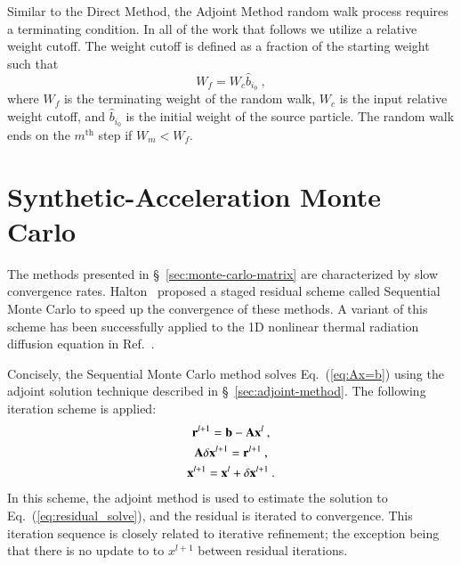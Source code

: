 \documentclass[preprint,12pt]{elsarticle}
\newcommand{\vA}{\ensuremath{\ve{A}}}
\newcommand{\vb}{\ensuremath{\ve{b}}}
\newcommand{\vx}{\ensuremath{\ve{x}}}
\newcommand{\vr}{\ensuremath{\ve{r}}}
\begin{document}
Similar to the Direct Method, the Adjoint Method random walk process
requires a terminating condition.  In all of the work that follows we
utilize a relative weight cutoff.  The weight cutoff is defined as a
fraction of the starting weight such that
\begin{equation}
  W_f = W_c\hat{b}_{i_0}\:,
  \label{eq:weight_cutoff}
\end{equation}
where $W_f$ is the terminating weight of the random walk, $W_c$ is the
input relative weight cutoff, and $\hat{b}_{i_0}$ is the initial
weight of the source particle.  The random walk ends on the
$m^\text{th}$ step if $W_m < W_f$.

\section{Synthetic-Acceleration Monte Carlo}
\label{sec:iter-refin-monte}

The methods presented in \S~\ref{sec:monte-carlo-matrix} are
characterized by slow convergence rates.
Halton~\cite{halton_1962,halton_1994} proposed a staged residual
scheme called Sequential Monte Carlo to speed up the convergence of
these methods.  A variant of this scheme has been successfully applied
to the 1D nonlinear thermal radiation diffusion equation in
Ref.~\cite{evans_2003}.

Concisely, the Sequential Monte Carlo method solves
Eq.~(\ref{eq:Ax=b}) using the adjoint solution technique described in
\S~\ref{sec:adjoint-method}.  The following iteration scheme is
applied:
\begin{subequations}
  \begin{gather}
    \vr^{l+1} = \vb - \vA\vx^{l}\:, \\
    \vA\delta\vx^{l+1} = \vr^{l+1}\:, \label{eq:residual_solve}\\
    \vx^{l+1} = \vx^{l} + \delta\vx^{l+1}\:.
  \end{gather}
\end{subequations}
In this scheme, the adjoint method is used to estimate the solution to
Eq.~(\ref{eq:residual_solve}), and the residual is iterated to
convergence.  This iteration sequence is closely related to iterative
refinement; the exception being that there is no update to to
$x^{l+1}$ between residual iterations.
\end{document}
